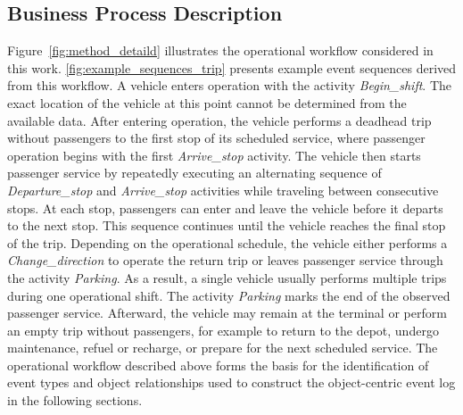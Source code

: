 \subsection{Business Process Description}
Figure~\ref{fig:method_detaild} illustrates the operational workflow considered in this work. \autoref{fig:example_sequences_trip} presents example event sequences derived from this workflow. A vehicle enters operation with the activity \textit{Begin\_shift}. The exact location of the vehicle at this point cannot be determined from the available data. After entering operation, the vehicle performs a deadhead trip without passengers to the first stop of its scheduled service, where passenger operation begins with the first \textit{Arrive\_stop} activity. The vehicle then starts passenger service by repeatedly executing an alternating sequence of \textit{Departure\_stop} and \textit{Arrive\_stop} activities while traveling between consecutive stops. At each stop, passengers can enter and leave the vehicle before it departs to the next stop. This sequence continues until the vehicle reaches the final stop of the trip. Depending on the operational schedule, the vehicle either performs a \textit{Change\_direction} to operate the return trip or leaves passenger service through the activity \textit{Parking}. As a result, a single vehicle usually performs multiple trips during one operational shift. The activity \textit{Parking} marks the end of the observed passenger service. Afterward, the vehicle may remain at the terminal or perform an empty trip without passengers, for example to return to the depot, undergo maintenance, refuel or recharge, or prepare for the next scheduled service. The operational workflow described above forms the basis for the identification of event types and object relationships used to construct the object-centric event log in the following sections.

 



